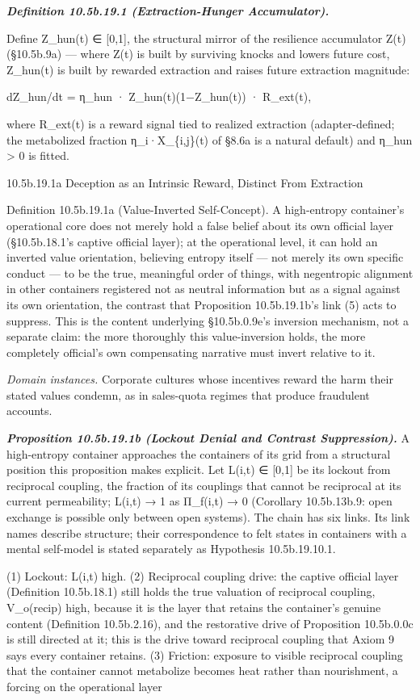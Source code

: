 \documentclass[
]{article}
\begin{document}
\emph{\textbf{Definition 10.5b.19.1 (Extraction-Hunger Accumulator).}}

Define Z\_hun(t) ∈ {[}0,1{]}, the structural mirror of the resilience
accumulator Z(t) (§10.5b.9a) --- where Z(t) is built by surviving knocks
and lowers future cost, Z\_hun(t) is built by rewarded extraction and
raises future extraction magnitude:

dZ\_hun/dt = η\_hun · Z\_hun(t)(1−Z\_hun(t)) · R\_ext(t),

where R\_ext(t) is a reward signal tied to realized extraction
(adapter-defined; the metabolized fraction η\_i·X\_\{i,j\}(t) of §8.6a
is a natural default) and η\_hun \textgreater{} 0 is fitted.

10.5b.19.1a Deception as an Intrinsic Reward, Distinct From Extraction

Definition 10.5b.19.1a (Value-Inverted Self-Concept). A high-entropy
container's operational core does not merely hold a false belief about
its own official layer (§10.5b.18.1's captive official layer); at the
operational level, it can hold an inverted value orientation, believing
entropy itself --- not merely its own specific conduct --- to be the
true, meaningful order of things, with negentropic alignment in other
containers registered not as neutral information but as a signal against
its own orientation, the contrast that Proposition 10.5b.19.1b's link
(5) acts to suppress. This is the content underlying §10.5b.0.9e's
inversion mechanism, not a separate claim: the more thoroughly this
value-inversion holds, the more completely official's own compensating
narrative must invert relative to it.

\emph{Domain instances.} Corporate cultures whose incentives reward the
harm their stated values condemn, as in sales-quota regimes that produce
fraudulent accounts.

\emph{\textbf{Proposition 10.5b.19.1b (Lockout Denial and Contrast
Suppression).}} A high-entropy container approaches the containers of
its grid from a structural position this proposition makes explicit. Let
L(i,t) ∈ {[}0,1{]} be its lockout from reciprocal coupling, the fraction
of its couplings that cannot be reciprocal at its current permeability;
L(i,t) → 1 as Π\_f(i,t) → 0 (Corollary 10.5b.13b.9: open exchange is
possible only between open systems). The chain has six links. Its link
names describe structure; their correspondence to felt states in
containers with a mental self-model is stated separately as Hypothesis
10.5b.19.10.1.

(1) Lockout: L(i,t) high. (2) Reciprocal coupling drive: the captive
official layer (Definition 10.5b.18.1) still holds the true valuation of
reciprocal coupling, V\_o(recip) high, because it is the layer that
retains the container's genuine content (Definition 10.5b.2.16), and the
restorative drive of Proposition 10.5b.0.0c is still directed at it;
this is the drive toward reciprocal coupling that Axiom 9 says every
container retains. (3) Friction: exposure to visible reciprocal coupling
that the container cannot metabolize becomes heat rather than
nourishment, a forcing on the operational layer
\end{document}
